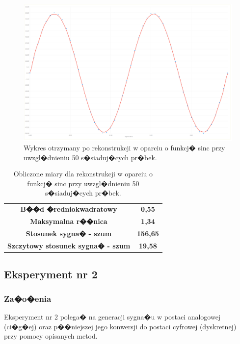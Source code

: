 \documentclass[12pt]{article}
\begin{document}
\begin{figure}[h!]
\includegraphics[scale=0.35]{w3.png}
\caption{Wykres otrzymany po rekonstrukcji w oparciu o funkcj� sinc przy uwzgl�dnieniu 50 s�siaduj�cych pr�bek.}
\end{figure}


\begin{table}[h!]
\centering
\caption{Obliczone miary dla rekonstrukcji w oparciu o funkcj� sinc przy uwzgl�dnieniu 50 s�siaduj�cych pr�bek.}
\begin{tabular}{c c}
\textbf{B��d �redniokwadratowy} & \textbf{0,55} \\
\textbf{Maksymalna r��nica} & \textbf{1,34} \\
\textbf{Stosunek sygna� - szum} & \textbf{156,65} \\
\textbf{Szczytowy stosunek sygna� - szum} & \textbf{19,58} \\
\end{tabular}
\end{table}

\newpage
\newpage
\subsection{Eksperyment nr 2}
\subsubsection{Za�o�enia}
Eksperyment nr 2 polega� na generacji sygna�u w postaci analogowej (ci�g�ej) oraz p��niejszej jego konwersji do postaci cyfrowej (dyskretnej) przy pomocy opisanych metod.
\end{document}
